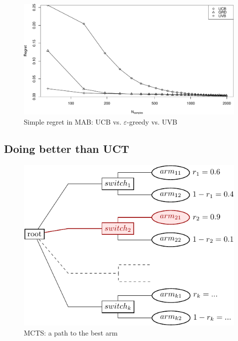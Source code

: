 \documentclass{article}
\begin{document}
\begin{figure}[t]
\centering
\includegraphics[scale=0.64]{onelevel-64.pdf}
\caption{Simple regret in MAB: UCB vs. $\varepsilon$-greedy vs. UVB}
\label{fig:onelevel-64}
\end{figure}


\subsection{Doing better than UCT}

\begin{figure}[t]
\centering
\includegraphics[scale=1.2]{twolevel-tree.pdf}
\caption{MCTS: a path to the best arm}
\label{fig:twolevel-tree}
\end{figure}
\end{document}
